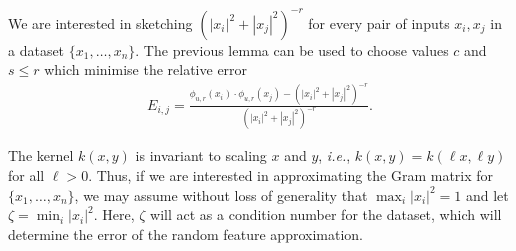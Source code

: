 \documentclass{article}
\theoremstyle{plain}
\theoremstyle{definition}
\theoremstyle{remark}
\newcommand{\eq}[1]{\begin{align*}#1\end{align*}}
\begin{document}
We are interested in sketching $( | x_i | ^2+ | x_j | ^2)^{-r}$ for every pair of inputs $x_i, x_j$ in a dataset $\{x_1,\dots,x_n\}$. The previous lemma can be used to choose values $c$ and $s\le r$ which minimise the relative error
\eq{
E_{i,j} = \frac{   \phi_{u,r}(  x_i )\cdot \phi_{u,r}( x_j ) - (| x_i | ^2+ | x_j | ^2)^{-r} }{( | x_i | ^2+ | x_j | ^2)^{-r}} .
}

The kernel $k(x,y)$ is invariant to scaling $x$ and $y$, \emph{i.e.}, $k(x,y)=k(\ell x,\ell y)$ for all $\ell>0$. Thus, if we are interested in approximating the Gram matrix for $\{x_1,\dots,x_n\}$, we may assume without loss of generality that $\max_i  | x_i | ^2 = 1$ and let $\zeta = \min_i  | x_i | ^2$. Here, $\zeta$ will act as a condition number for the dataset, which will determine the error of the random feature approximation.
\end{document}
